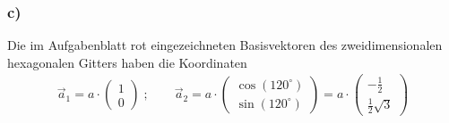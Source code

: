 \subsubsection*{c)}
Die im Aufgabenblatt rot eingezeichneten Basisvektoren des zweidimensionalen
hexagonalen Gitters haben die Koordinaten
\begin{align}
  \vec a_1 = a \cdot \begin{pmatrix} 1 \\ 0 \end{pmatrix} \;; \qquad
  \vec a_2 = a \cdot \begin{pmatrix} \cos(120^\circ)\\ \sin(120^\circ)\end{pmatrix} =
  a \cdot \begin{pmatrix} -\frac{1}{2}\\\frac{1}{2} \sqrt{3}\end{pmatrix}
\end{align}


